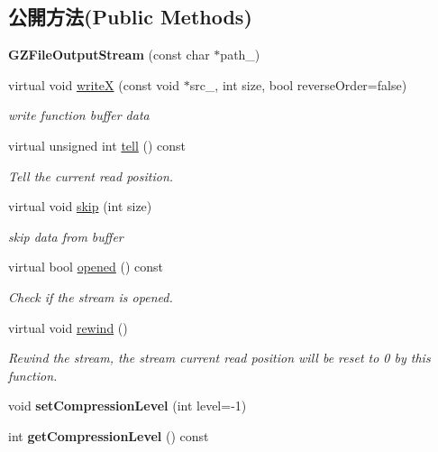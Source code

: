 \subsection*{公開方法(Public Methods)}
\begin{DoxyCompactItemize}
\item 
{\bfseries G\+Z\+File\+Output\+Stream} (const char $\ast$path\+\_\+)\hypertarget{class_magnum_1_1_g_z_file_output_stream_a9f09c47d5a982f78c67bac815c64b523}{}\label{class_magnum_1_1_g_z_file_output_stream_a9f09c47d5a982f78c67bac815c64b523}

\item 
virtual void \hyperlink{class_magnum_1_1_g_z_file_output_stream_a02a08c50826c8889cbe6a04f0fedaacd}{writeX} (const void $\ast$src\+\_\+, int size, bool reverse\+Order=false)
\begin{DoxyCompactList}\small\item\em write function buffer data \end{DoxyCompactList}\item 
virtual unsigned int \hyperlink{class_magnum_1_1_g_z_file_output_stream_a1b8131bc41f93dec6859de299d42d483}{tell} () const 
\begin{DoxyCompactList}\small\item\em Tell the current read position. \end{DoxyCompactList}\item 
virtual void \hyperlink{class_magnum_1_1_g_z_file_output_stream_a57acaa796c10ebafcd274de4f2702c82}{skip} (int size)
\begin{DoxyCompactList}\small\item\em skip data from buffer \end{DoxyCompactList}\item 
virtual bool \hyperlink{class_magnum_1_1_g_z_file_output_stream_ae8fcdc72044b8de627ceabdfca02bd0b}{opened} () const 
\begin{DoxyCompactList}\small\item\em Check if the stream is opened. \end{DoxyCompactList}\item 
virtual void \hyperlink{class_magnum_1_1_g_z_file_output_stream_a4a507512d72f18380b23d9328778770a}{rewind} ()
\begin{DoxyCompactList}\small\item\em Rewind the stream, the stream current read position will be reset to 0 by this function. \end{DoxyCompactList}\item 
void {\bfseries set\+Compression\+Level} (int level=-\/1)\hypertarget{class_magnum_1_1_g_z_file_output_stream_a52d2209171596ca200ba920e67a65bef}{}\label{class_magnum_1_1_g_z_file_output_stream_a52d2209171596ca200ba920e67a65bef}

\item 
int {\bfseries get\+Compression\+Level} () const \hypertarget{class_magnum_1_1_g_z_file_output_stream_a4024caaa33cd99d824f57bcc36b8ee68}{}\label{class_magnum_1_1_g_z_file_output_stream_a4024caaa33cd99d824f57bcc36b8ee68}

\end{DoxyCompactItemize}
